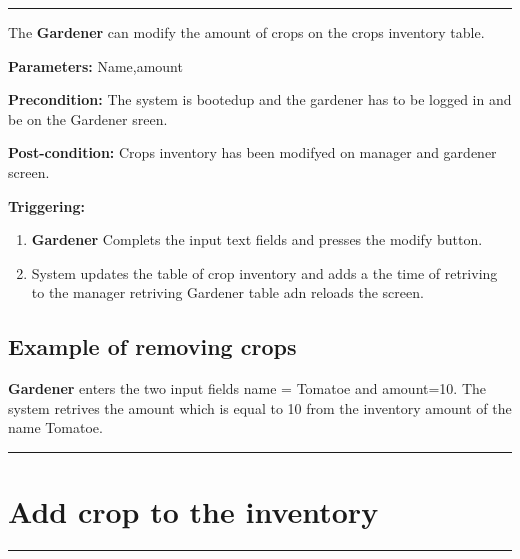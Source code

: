 \hrule
\hfill
\vspace{0.5cm}
\label{operation:modifyCropsAmount}
The \textbf{Gardener} can modify the amount of crops on the crops inventory
table.
\begin{description}
\item \textbf{Parameters:} Name,amount
\item \textbf{Precondition:} The system is bootedup and the gardener has to be
logged in and be on the Gardener sreen.
\item \textbf{Post-condition:} Crops inventory has been modifyed on manager and
gardener screen.

\item \textbf{Triggering:}
\begin{enumerate}
\item \textbf{Gardener} Complets the input text fields and presses the modify
button.
\item System updates the table of crop inventory and adds a the time of
retriving to the manager retriving Gardener table adn reloads the screen.
\end{enumerate}
\end{description}

\subsection{Example of removing crops}
\textbf{Gardener} enters the two input fields name = Tomatoe and amount=10.
The system retrives the amount which is equal to 10 from the inventory amount of
the name Tomatoe.
\hfill
\vspace{0.5cm}
\hrule



















\section{Add crop to the inventory}

\hrule
\hfill
\vspace{0.5cm}

\label{operation:Accept a diffrent crop}


